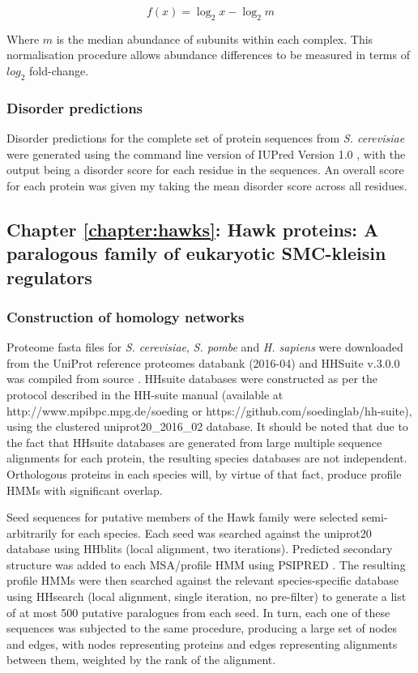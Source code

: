 \documentclass[a4paper,11pt,twoside,openright]{scrbook}
\begin{document}
\begin{displaymath}
    f(x) = \log_2 x - \log_2 m
\end{displaymath}

Where $m$ is the median abundance of subunits within each complex. This
normalisation procedure allows abundance differences to be measured in terms of
$log_{2}$ fold-change.

\subsubsection{Disorder predictions}
Disorder predictions for the complete set of protein sequences from \textit{S.
cerevisiae} were generated using the command line version of IUPred Version 1.0
\cite{Dosztanyi2005a,Dosztanyi2005}, with the output being a disorder score for
each residue in the sequences. An overall score for each protein was given my
taking the mean disorder score across all residues.

\subsection{Chapter \ref*{chapter:hawks}: Hawk proteins: A paralogous family of
eukaryotic SMC-kleisin regulators}\label{subsection:hawkmethods}

\subsubsection{Construction of homology networks}
Proteome fasta files for \textit{S. cerevisiae}, \textit{S. pombe} and
\textit{H. sapiens} were downloaded from the UniProt reference proteomes
databank \cite{Consortium2017} (2016-04) and HHSuite v.3.0.0 was compiled from
source \cite{Soding2005,Remmert2011}. HHsuite databases were constructed as per
the protocol described in the HH-suite manual (available at
http://www.mpibpc.mpg.de/soeding or https://github.com/soedinglab/hh-suite),
using the clustered uniprot20\_2016\_02 database. It should be noted that due to
the fact that HHsuite databases are generated from large multiple sequence
alignments for each protein, the resulting species databases are not
independent. Orthologous proteins in each species will, by virtue of that fact,
produce profile HMMs with significant overlap.

Seed sequences for putative members of the Hawk family were selected
semi-arbitrarily for each species. Each seed was searched against the uniprot20
database using HHblits \cite{Remmert2011} (local alignment, two iterations).
Predicted secondary structure was added to each MSA/profile HMM using PSIPRED
\cite{Jones1999}. The resulting profile HMMs were then searched against the
relevant species-specific database using HHsearch (local alignment, single
iteration, no pre-filter) to generate a list of at most 500 putative paralogues
from each seed. In turn, each one of these sequences was subjected to the same
procedure, producing a large set of nodes and edges, with nodes representing
proteins and edges representing alignments between them, weighted by the rank of
the alignment.
\end{document}
